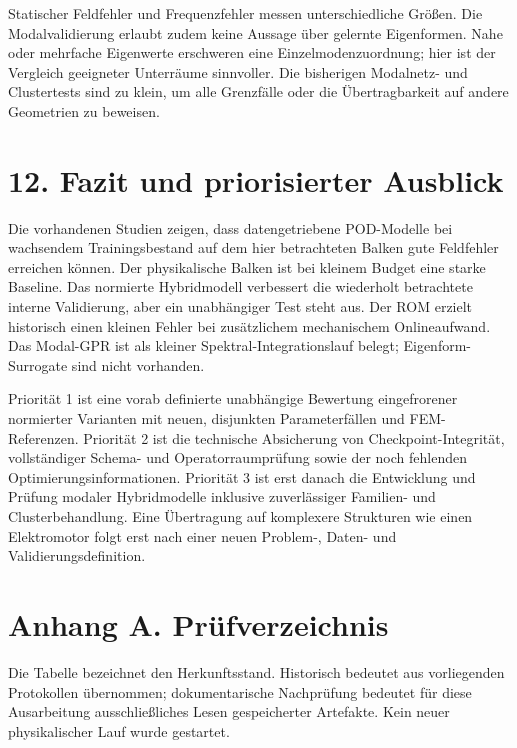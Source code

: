 \documentclass[11pt,a4paper]{article}
\begin{document}
Statischer Feldfehler und Frequenzfehler messen unterschiedliche Größen. Die Modalvalidierung erlaubt zudem keine Aussage über gelernte Eigenformen. Nahe oder mehrfache Eigenwerte erschweren eine Einzelmodenzuordnung; hier ist der Vergleich geeigneter Unterräume sinnvoller. Die bisherigen Modalnetz- und Clustertests sind zu klein, um alle Grenzfälle oder die Übertragbarkeit auf andere Geometrien zu beweisen.

\section{12. Fazit und priorisierter Ausblick}
Die vorhandenen Studien zeigen, dass datengetriebene POD-Modelle bei wachsendem Trainingsbestand auf dem hier betrachteten Balken gute Feldfehler erreichen können. Der physikalische Balken ist bei kleinem Budget eine starke Baseline. Das normierte Hybridmodell verbessert die wiederholt betrachtete interne Validierung, aber ein unabhängiger Test steht aus. Der ROM erzielt historisch einen kleinen Fehler bei zusätzlichem mechanischem Onlineaufwand. Das Modal-GPR ist als kleiner Spektral-Integrationslauf belegt; Eigenform-Surrogate sind nicht vorhanden.

Priorität 1 ist eine vorab definierte unabhängige Bewertung eingefrorener normierter Varianten mit neuen, disjunkten Parameterfällen und FEM-Referenzen. Priorität 2 ist die technische Absicherung von Checkpoint-Integrität, vollständiger Schema- und Operatorraumprüfung sowie der noch fehlenden Optimierungsinformationen. Priorität 3 ist erst danach die Entwicklung und Prüfung modaler Hybridmodelle inklusive zuverlässiger Familien- und Clusterbehandlung. Eine Übertragung auf komplexere Strukturen wie einen Elektromotor folgt erst nach einer neuen Problem-, Daten- und Validierungsdefinition.

\section{Anhang A. Prüfverzeichnis}
Die Tabelle bezeichnet den Herkunftsstand. Historisch bedeutet aus vorliegenden Protokollen übernommen; dokumentarische Nachprüfung bedeutet für diese Ausarbeitung ausschließliches Lesen gespeicherter Artefakte. Kein neuer physikalischer Lauf wurde gestartet.
\end{document}

